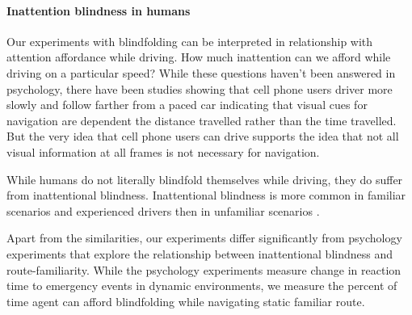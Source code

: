\paragraph{Inattention blindness in humans}
Our experiments with blindfolding can be interpreted in relationship with attention affordance while driving. How much inattention can we afford while driving on a particular speed? While these questions haven't been answered in psychology, there have been studies \cite{IrBoWiACP2010} showing that cell phone users driver more slowly and follow farther from a paced car indicating that visual cues for navigation are dependent the distance travelled rather than the time travelled. But the very idea that cell phone users can drive supports the idea that not all visual information at all frames is not necessary for navigation.

While humans do not literally blindfold themselves while driving, they do suffer from inattentional blindness. Inattentional blindness is more common in familiar scenarios and experienced drivers then in unfamiliar scenarios \cite{YaLiFeAAAI2015,YaSpHF2014,ChStTPB2013}.

Apart from the similarities, our experiments differ significantly from psychology experiments that explore the relationship between inattentional blindness and route-familiarity. While the psychology experiments measure change in reaction time to emergency events in dynamic environments, we measure the percent of time agent can afford blindfolding while navigating static familiar route.
